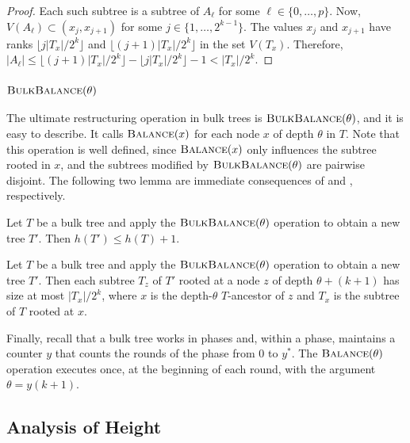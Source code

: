 \documentclass[kpfonts]{patmorin}
\let\le\leqslant
\begin{document}
\begin{proof}
  Each such subtree is a subtree of $A_\ell$ for some $\ell\in\{0,\ldots,p\}$. Now, $V(A_\ell)\subset (x_j,x_{j+1})$ for some $j\in\{1,\ldots,2^{k-1}\}$.  The values $x_j$ and $x_{j+1}$ have ranks $\lfloor j|T_x|/2^k\rfloor$ and $\lfloor (j+1)|T_x|/2^k\rfloor$ in the set $V(T_x)$.  Therefore, $|A_\ell|\le \lfloor (j+1)|T_x|/2^k\rfloor- \lfloor j|T_x|/2^k\rfloor -1 < |T_x|/2^k$.
\end{proof}

\subsubsection{$\textsc{BulkBalance}(\theta)$}

The ultimate restructuring operation in bulk trees is $\textsc{BulkBalance}(\theta)$, and it is easy to describe.  It calls $\textsc{Balance}(x)$ for each node $x$ of depth $\theta$ in $T$. Note that this operation is well defined, since $\textsc{Balance}(x)$ only influences the subtree rooted in $x$, and the subtrees modified by $\textsc{BulkBalance}(\theta)$ are pairwise disjoint.
The following two lemma are immediate consequences of  and , respectively.

\begin{lem}
  Let $T$ be a bulk tree and apply the $\textsc{BulkBalance}(\theta)$ operation to obtain a new tree $T'$.  Then $h(T')\le h(T)+1$.
\end{lem}

\begin{lem}
  Let $T$ be a bulk tree and apply the $\textsc{BulkBalance}(\theta)$ operation to obtain a new tree $T'$.  Then each subtree $T_z$ of $T'$ rooted at a node $z$ of depth $\theta+(k+1)$ has size at most $|T_x|/2^k$, where $x$ is the depth-$\theta$ $T$-ancestor of $z$ and $T_x$ is the subtree of $T$ rooted at $x$.
\end{lem}

Finally, recall that a bulk tree works in phases and, within a phase, maintains a counter $y$ that counts the rounds of the phase from $0$ to $y^*$.  The $\textsc{Balance}(\theta)$ operation executes once, at the beginning of each round, with the argument $\theta=y(k+1)$.

\subsection{Analysis of Height}
\end{document}
